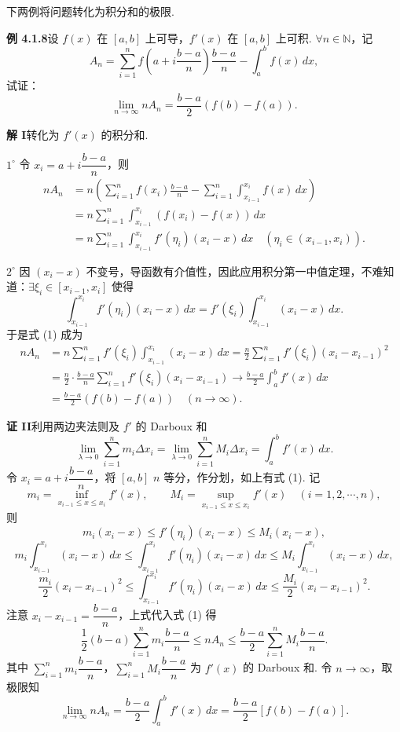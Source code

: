 \documentclass[UTF8, 12pt, fontset=fandol, oneside]{ctexart}
\begin{document}
下两例将问题转化为积分和的极限.

\noindent\textbf{例 4.1.8}\quad 设 $f(x)$ 在 $[a,b]$ 上可导，$f'(x)$ 在 $[a,b]$ 上可积. $\forall n\in\mathbb{N}$，记
\[
A_n=\sum_{i=1}^n f\left(a+i\frac{b-a}{n}\right)\frac{b-a}{n}
-\int_a^b f(x)\,dx,
\]
试证：
\[
\lim_{n\to\infty}nA_n=\frac{b-a}{2}(f(b)-f(a)).
\]

\noindent\textbf{解 I}\quad 转化为 $f'(x)$ 的积分和.

$1^\circ$ 令 $x_i=a+i\dfrac{b-a}{n}$，则
\begin{equation}
\begin{aligned}
nA_n
&=n\left(\sum_{i=1}^n f(x_i)\frac{b-a}{n}
-\sum_{i=1}^n\int_{x_{i-1}}^{x_i}f(x)\,dx\right)\\
&=n\sum_{i=1}^n\int_{x_{i-1}}^{x_i}(f(x_i)-f(x))\,dx\\
&=n\sum_{i=1}^n\int_{x_{i-1}}^{x_i}f'(\eta_i)(x_i-x)\,dx
\quad(\eta_i\in(x_{i-1},x_i)).
\end{aligned}
\tag{1}
\end{equation}

$2^\circ$ 因 $(x_i-x)$ 不变号，导函数有介值性，因此应用积分第一中值定理，不难知道：$\exists\xi_i\in[x_{i-1},x_i]$ 使得
\[
\int_{x_{i-1}}^{x_i}f'(\eta_i)(x_i-x)\,dx
=f'(\xi_i)\int_{x_{i-1}}^{x_i}(x_i-x)\,dx.
\]
于是式 (1) 成为
\[
\begin{aligned}
nA_n
&=n\sum_{i=1}^n f'(\xi_i)\int_{x_{i-1}}^{x_i}(x_i-x)\,dx
=\frac n2\sum_{i=1}^n f'(\xi_i)(x_i-x_{i-1})^2\\
&=\frac n2\cdot\frac{b-a}{n}\sum_{i=1}^n f'(\xi_i)(x_i-x_{i-1})
\to \frac{b-a}{2}\int_a^b f'(x)\,dx\\
&=\frac{b-a}{2}(f(b)-f(a))\quad(n\to\infty).
\end{aligned}
\]

\noindent\textbf{证 II}\quad 利用两边夹法则及 $f'$ 的 Darboux 和
\[
\lim_{\lambda\to0}\sum_{i=1}^n m_i\Delta x_i
=\lim_{\lambda\to0}\sum_{i=1}^n M_i\Delta x_i
=\int_a^b f'(x)\,dx.
\]
令 $x_i=a+i\dfrac{b-a}{n}$，将 $[a,b]$ $n$ 等分，作分划，如上有式 (1). 记
\[
m_i=\inf_{x_{i-1}\le x\le x_i}f'(x),\qquad
M_i=\sup_{x_{i-1}\le x\le x_i}f'(x)\quad(i=1,2,\cdots,n),
\]
则
\[
m_i(x_i-x)\le f'(\eta_i)(x_i-x)\le M_i(x_i-x),
\]
\[
m_i\int_{x_{i-1}}^{x_i}(x_i-x)\,dx
\le\int_{x_{i-1}}^{x_i}f'(\eta_i)(x_i-x)\,dx
\le M_i\int_{x_{i-1}}^{x_i}(x_i-x)\,dx,
\]
\[
\frac{m_i}{2}(x_i-x_{i-1})^2
\le\int_{x_{i-1}}^{x_i}f'(\eta_i)(x_i-x)\,dx
\le\frac{M_i}{2}(x_i-x_{i-1})^2.
\]
注意 $x_i-x_{i-1}=\dfrac{b-a}{n}$，上式代入式 (1) 得
\[
\frac12(b-a)\sum_{i=1}^n m_i\frac{b-a}{n}
\le nA_n\le
\frac{b-a}{2}\sum_{i=1}^n M_i\frac{b-a}{n}.
\]
其中 $\sum_{i=1}^n m_i\dfrac{b-a}{n}$，$\sum_{i=1}^n M_i\dfrac{b-a}{n}$ 为 $f'(x)$ 的 Darboux 和. 令 $n\to\infty$，取极限知
\[
\lim_{n\to\infty}nA_n
=\frac{b-a}{2}\int_a^b f'(x)\,dx
=\frac{b-a}{2}[f(b)-f(a)].
\]
\end{document}
